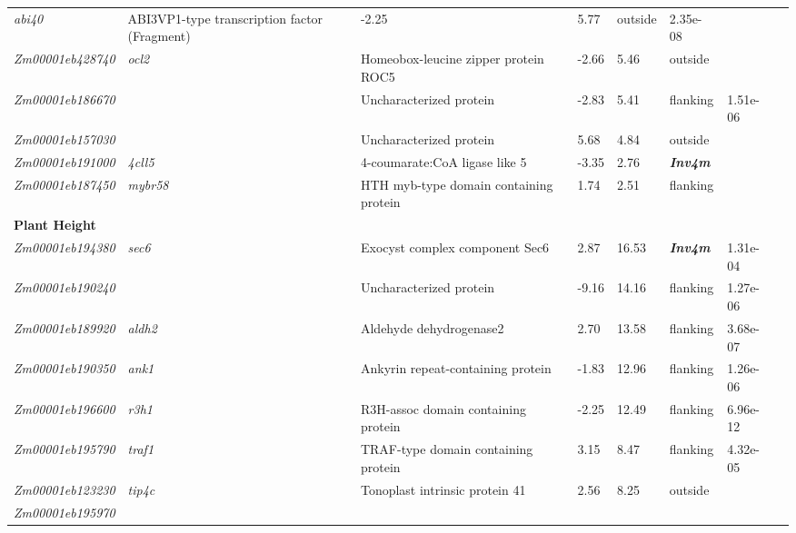 \documentclass[9pt,twocolumn,twoside]{rilabRxiv}
\newcommand{\invfour}{\textit{Inv4m}\xspace}
\begin{document}
\begin{table}[!ht]
{\begin{tabular}{llllllll}
  \textit{abi40} &
  ABI3VP1-type transcription factor (Fragment) &
  -2.25 &
  5.77 &
  outside &
  2.35e-08 &
  \cite{liu2023, peiffer2013, peiffer2014, wang2021} \\
  \textit{Zm00001eb428740} &
  \textit{ocl2} &
  Homeobox-leucine zipper protein ROC5 &
  -2.66 &
  5.46 &
  outside &
   &
  \cite{wang2021} \\
  \textit{Zm00001eb186670} &
   &
  Uncharacterized protein &
  -2.83 &
  5.41 &
  flanking &
  1.51e-06 &
  \cite{jiao2012, li2016, liu2023} \\
  \textit{Zm00001eb157030} &
   &
  Uncharacterized protein &
  5.68 &
  4.84 &
  outside &
   &
  \cite{li2016, liu2023} \\
  \textit{Zm00001eb191000} &
  \textit{4cll5} &
  4-coumarate:CoA ligase like 5 &
  -3.35 &
  2.76 &
  \textbf{\invfour} &
   &
  \cite{wang2021} \\
  \textit{Zm00001eb187450} &
  \textit{mybr58} &
  HTH myb-type domain containing protein &
  1.74 &
  2.51 &
  flanking &
   &
  \cite{wang2021} \\
 \midrule
\multicolumn{8}{l}{\textbf{Plant Height}} \\ \midrule
  \textit{Zm00001eb194380} &
  \textit{sec6} &
  Exocyst complex component Sec6 &
  2.87 &
  16.53 &
  \textbf{\invfour} &
  1.31e-04 &
  \cite{liu2023, peiffer2014} \\
  \textit{Zm00001eb190240} &
   &
  Uncharacterized protein &
  -9.16 &
  14.16 &
  flanking &
  1.27e-06 &
  \cite{liu2023} \\
  \textit{Zm00001eb189920} &
  \textit{aldh2} &
  Aldehyde dehydrogenase2 &
  2.70 &
  13.58 &
  flanking &
  3.68e-07 &
  \cite{liu2023, peiffer2014} \\
  \textit{Zm00001eb190350} &
  \textit{ank1} &
  Ankyrin repeat-containing protein &
  -1.83 &
  12.96 &
  flanking &
  1.26e-06 &
  \cite{liu2023} \\
  \textit{Zm00001eb196600} &
  \textit{r3h1} &
  R3H-assoc domain containing protein &
  -2.25 &
  12.49 &
  flanking &
  6.96e-12 &
  \cite{liu2023, peiffer2014} \\
  \textit{Zm00001eb195790} &
  \textit{traf1} &
  TRAF-type domain containing protein &
  3.15 &
  8.47 &
  flanking &
  4.32e-05 &
  \cite{liu2023, peiffer2014} \\
  \textit{Zm00001eb123230} &
  \textit{tip4c} &
  Tonoplast intrinsic protein 41 &
  2.56 &
  8.25 &
  outside &
   &
  \cite{liu2023} \\
  \textit{Zm00001eb195970} &

\end{tabular}}
\end{table}
\end{document}
